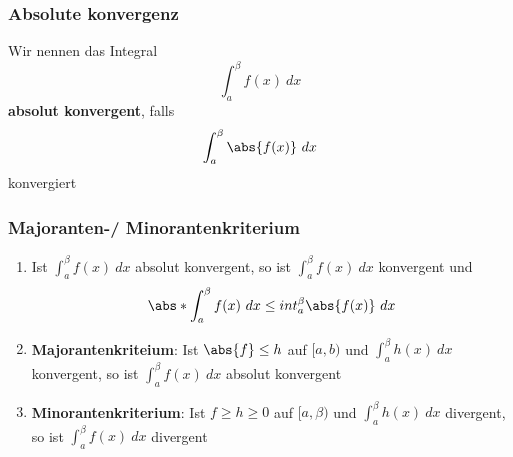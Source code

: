 \documentclass{kit}
\begin{document}
    \subsubsection{Absolute konvergenz}
      Wir nennen das Integral
      $$\int^\beta_af(x)\ dx$$
      \textbf{absolut konvergent}, falls
      $$\int^\beta_a\abs{f(x)}\ dx$$
      konvergiert
    \subsubsection{Majoranten-/ Minorantenkriterium}
      \begin{enumerate}
        \item Ist $\int^\beta_af(x)\ dx$ absolut konvergent, so ist $\int^\beta_af(x)\ dx$ konvergent und
          $$\abs*{\int^\beta_af(x)\ dx}\le\\int^\beta_a\abs{f(x)}\ dx$$
        \item \textbf{Majorantenkriteium}: Ist $\abs{f}\le h$ auf $[a,b)$ und $\int^\beta_ah(x)\ dx$ konvergent, so ist $\int^\beta_af(x)\ dx$ absolut konvergent
        \item \textbf{Minorantenkriterium}: Ist $f\ge h\ge0$ auf $[a,\beta)$ und $\int^\beta_ah(x)\ dx$ divergent, so ist $\int^\beta_af(x)\ dx$ divergent
      \end{enumerate}
\end{document}
